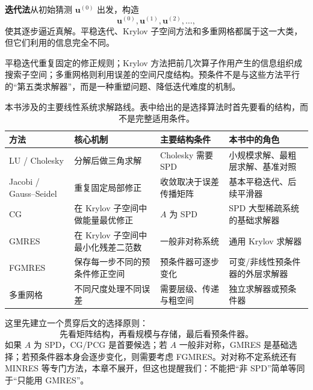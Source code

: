 \textbf{迭代法}从初始猜测 $\bm u^{(0)}$ 出发，构造
\begin{equation}
\bm u^{(0)},\bm u^{(1)},\bm u^{(2)},\ldots,
\end{equation}
使其逐步逼近真解。平稳迭代、Krylov 子空间方法和多重网格都属于这一大类，但它们利用的信息完全不同。

平稳迭代重复固定的修正规则；Krylov 方法把前几次算子作用产生的信息组织成搜索子空间；多重网格则利用误差的空间尺度结构。预条件不是与这些方法平行的“第五类求解器”，而是一种重塑问题、降低迭代难度的机制。

\begin{table}[htbp]
\centering
\footnotesize
\begin{tabularx}{0.96\textwidth}{>{\raggedright\arraybackslash}p{2.3cm}
                                  >{\raggedright\arraybackslash}p{3.8cm}
                                  >{\raggedright\arraybackslash}p{2.9cm}
                                  >{\raggedright\arraybackslash}X}
\toprule
方法 & 核心机制 & 主要结构条件 & 本书中的角色\\
\midrule
LU / Cholesky & 分解后做三角求解 & Cholesky 需要 SPD & 小规模求解、最粗层求解、基准对照\\
Jacobi / Gauss--Seidel & 重复固定局部修正 & 收敛取决于误差传播矩阵 & 基本平稳迭代、后续平滑器\\
CG & 在 Krylov 子空间中做能量最优修正 & $A$ 为 SPD & SPD 大型稀疏系统的基础求解器\\
GMRES & 在 Krylov 子空间中最小化残差二范数 & 一般非对称系统 & 通用 Krylov 求解器\\
FGMRES & 保存每一步不同的预条件修正空间 & 预条件器可逐步变化 & 可变/非线性预条件器的外层求解器\\
多重网格 & 不同尺度处理不同误差 & 需要层级、传递与粗空间 & 独立求解器或预条件器\\
\bottomrule
\end{tabularx}
\caption{本书涉及的主要线性系统求解路线。表中给出的是选择算法时首先要看的结构，而不是完整适用条件。}
\label{tab:linear-solver-map}
\end{table}

这里先建立一个贯穿后文的选择原则：
\begin{equation}
\boxed{
\text{先看矩阵结构，再看规模与存储，最后看预条件器。}
}
\end{equation}
如果 $A$ 为 SPD，CG/PCG 是首要候选；若 $A$ 一般非对称，GMRES 是基础选择；若预条件器本身会逐步变化，则需要考虑 FGMRES。对对称不定系统还有 MINRES 等专门方法，本章不展开，但这也提醒我们：不能把“非 SPD”简单等同于“只能用 GMRES”。

